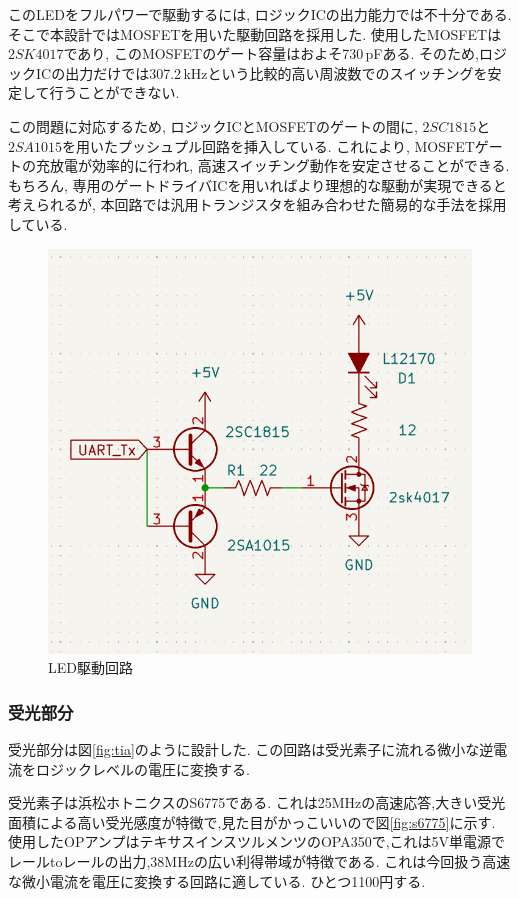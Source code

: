 \documentclass[a4paper,10pt]{article}
\begin{document}
\begin{multicols}{2}[\raggedcolumns]
このLEDをフルパワーで駆動するには, ロジックICの出力能力では不十分である.  
そこで本設計ではMOSFETを用いた駆動回路を採用した.  
使用したMOSFETは$2SK4017$であり, このMOSFETのゲート容量はおよそ730\,pFある.
そのため,ロジックICの出力だけでは307.2\,kHzという比較的高い周波数でのスイッチングを安定して行うことができない.  

この問題に対応するため, ロジックICとMOSFETのゲートの間に, $2SC1815$と$2SA1015$を用いたプッシュプル回路を挿入している.  
これにより, MOSFETゲートの充放電が効率的に行われ, 高速スイッチング動作を安定させることができる.  
もちろん, 専用のゲートドライバICを用いればより理想的な駆動が実現できると考えられるが, 本回路では汎用トランジスタを組み合わせた簡易的な手法を採用している.

\begin{figure}[H]
    \centering
    \includegraphics[width=\linewidth]{figure/led.png} 
    \caption{LED駆動回路} 
    \label{fig:led}
\end{figure}

\subsubsection{受光部分}
受光部分は図\ref{fig:tia}のように設計した.
この回路は受光素子に流れる微小な逆電流をロジックレベルの電圧に変換する.

受光素子は浜松ホトニクスのS6775である.
これは25MHzの高速応答,大きい受光面積による高い受光感度が特徴で,見た目がかっこいいので図\ref{fig:s6775}に示す.
使用したOPアンプはテキサスインスツルメンツのOPA350で,これは5V単電源でレールtoレールの出力,38MHzの広い利得帯域が特徴である.
これは今回扱う高速な微小電流を電圧に変換する回路に適している.
ひとつ1100円する.


\end{multicols}
\end{document}
